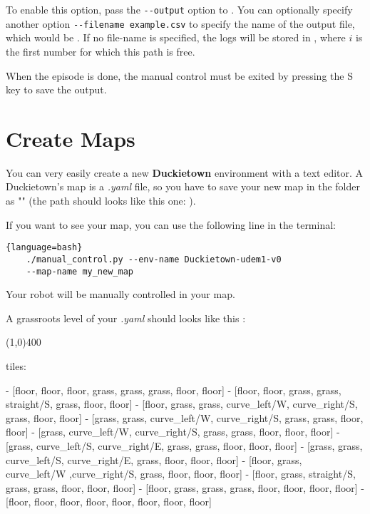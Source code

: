 To enable this option, pass the \lstinline[language=bash]+--output+ option to .
You can optionally specify another option \lstinline[language=bash]+--filename example.csv+ to specify the name of the output file, which would be .
If no file-name is specified, the logs will be stored in , where $i$ is the first number for which this path is free.

When the episode is done, the manual control must be exited by pressing the S key to save the output.


\section{Create Maps}
You can very easily create a new \textbf{Duckietown} environment with a text editor.
A Duckietown's map is a \textit{.yaml} file, so you have to save your new map in the folder  as "" (the path should looks like this one: ).

If you want to see your map, you can use the following line in the terminal:

\begin{lstlisting}{language=bash}
    ./manual_control.py --env-name Duckietown-udem1-v0
    --map-name my_new_map
\end{lstlisting}

\noindent Your robot will be manually controlled in your map.

\noindent A grassroots level of your \textit{.yaml} should looks like this :

\begin{center}
    \line(1,0){400}
\end{center}
\noindent tiles:

\noindent- [floor, floor, floor, grass, grass, grass, floor, floor]\newline
- [floor, floor, grass, grass, straight/S, grass, floor, floor]\newline
- [floor, grass, grass, curve\_left/W, curve\_right/S, grass, floor, floor]\newline
- [grass, grass, curve\_left/W, curve\_right/S, grass, grass, floor, floor]\newline
- [grass, curve\_left/W, curve\_right/S, grass, grass, floor, floor, floor]\newline
- [grass, curve\_left/S, curve\_right/E, grass, grass, floor, floor, floor]\newline
- [grass, grass, curve\_left/S, curve\_right/E, grass, floor, floor, floor]\newline
- [floor, grass, curve\_left/W ,curve\_right/S, grass, floor, floor, floor]\newline
- [floor, grass, straight/S, grass, grass, floor, floor, floor]\newline
- [floor, grass, grass, grass, floor, floor, floor, floor]\newline
- [floor, floor, floor, floor, floor, floor, floor, floor]

